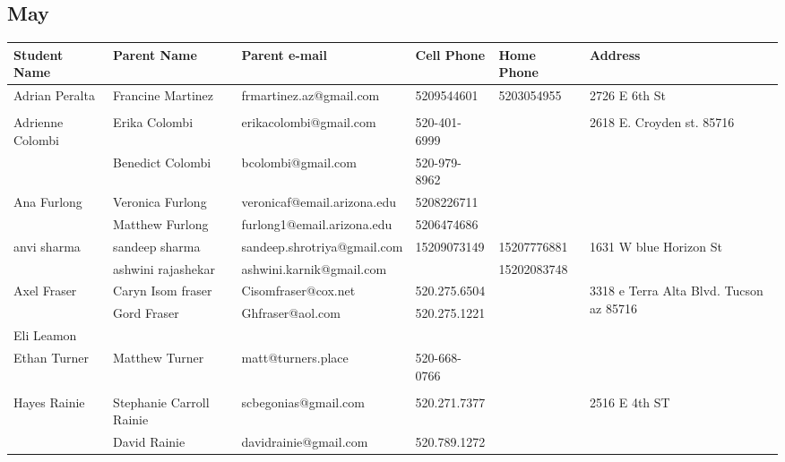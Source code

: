 \documentclass[landscape]{article}\usepackage[]{graphicx}\usepackage[]{color}
\begin{document}
\subsection{May}
\begin{longtable}{|p{100pt}|p{100pt}|p{140pt}|p{60pt}|p{64pt}|p{120pt}|}
\textbf{Student Name} & \textbf{Parent Name} & \textbf{Parent e-mail} & \textbf{Cell Phone} & \textbf{Home Phone} & \textbf{Address}\\
\hline
\hline
\multirow{2}{100pt}{Adrian Peralta} & Francine Martinez & frmartinez.az@gmail.com & 5209544601 & 5203054955 & \multirow{2}{120pt}{2726 E 6th St} \\
 &  &  &  &  & \\
\hline
\multirow{2}{100pt}{Adrienne Colombi} & Erika Colombi & erikacolombi@gmail.com & 520-401-6999 &  & \multirow{2}{120pt}{2618 E. Croyden st. 85716} \\
 & Benedict Colombi & bcolombi@gmail.com & 520-979-8962 &  & \\
\hline
\multirow{2}{100pt}{Ana Furlong} & Veronica Furlong & veronicaf@email.arizona.edu & 5208226711 &  & \multirow{2}{120pt}{} \\
 & Matthew Furlong & furlong1@email.arizona.edu & 5206474686 &  & \\
\hline
\multirow{2}{100pt}{anvi sharma} & sandeep sharma & sandeep.shrotriya@gmail.com & 15209073149 & 15207776881 & \multirow{2}{120pt}{1631 W blue Horizon St} \\
 & ashwini rajashekar & ashwini.karnik@gmail.com &  & 15202083748 & \\
\hline
\multirow{2}{100pt}{Axel Fraser} & Caryn Isom fraser & Cisomfraser@cox.net & 520.275.6504 &  & \multirow{2}{120pt}{3318 e Terra Alta Blvd. Tucson az 85716 } \\
 & Gord Fraser  & Ghfraser@aol.com & 520.275.1221 &  & \\
\hline
\multirow{2}{100pt}{Eli Leamon} &  &  &  &  & \multirow{2}{120pt}{} \\
 &  &  &  &  & \\
\hline
\multirow{2}{100pt}{Ethan Turner} & Matthew Turner & matt@turners.place & 520-668-0766 &  & \multirow{2}{120pt}{} \\
 &  &  &  &  & \\
\hline
\multirow{2}{100pt}{Hayes Rainie} & Stephanie Carroll Rainie & scbegonias@gmail.com & 520.271.7377 &  & \multirow{2}{120pt}{2516 E 4th ST} \\
 & David Rainie & davidrainie@gmail.com & 520.789.1272 &  & \\

\end{longtable}
\end{document}
